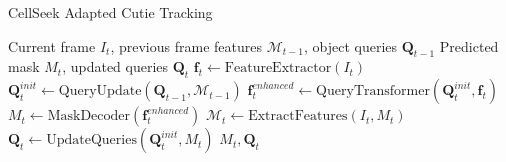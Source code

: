 \documentclass[../cellseek_paper.tex]{subfiles}
\begin{document}
\begin{algorithm}[H]
  \caption{CellSeek Adapted Cutie Tracking}
  \begin{algorithmic}[1]
    \REQUIRE Current frame $I_t$, previous frame features $\mathcal{M}_{t-1}$, object queries $\mathbf{Q}_{t-1}$
    \ENSURE Predicted mask $M_t$, updated queries $\mathbf{Q}_t$
    \STATE $\mathbf{f}_t \leftarrow \text{FeatureExtractor}(I_t)$
    \STATE $\mathbf{Q}_t^{init} \leftarrow \text{QueryUpdate}(\mathbf{Q}_{t-1}, \mathcal{M}_{t-1})$
    \STATE $\mathbf{f}_t^{enhanced} \leftarrow \text{QueryTransformer}(\mathbf{Q}_t^{init}, \mathbf{f}_t)$
    \STATE $M_t \leftarrow \text{MaskDecoder}(\mathbf{f}_t^{enhanced})$
    \STATE $\mathcal{M}_t \leftarrow \text{ExtractFeatures}(I_t, M_t)$ 
    \STATE $\mathbf{Q}_t \leftarrow \text{UpdateQueries}(\mathbf{Q}_t^{init}, M_t)$
    \RETURN $M_t, \mathbf{Q}_t$
  \end{algorithmic}
\end{algorithm}
\end{document}

